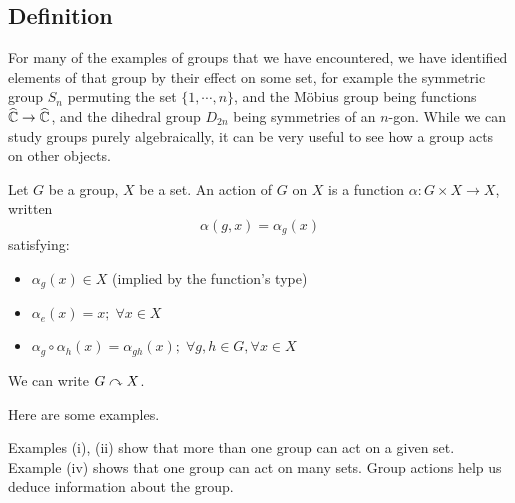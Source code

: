 \subsection{Definition}
For many of the examples of groups that we have encountered, we have identified elements of that group by their effect on some set, for example the symmetric group \(S_n\) permuting the set \(\{ 1, \cdots, n \}\), and the M\"obius group being functions \(\widehat{\mathbb C} \to \widehat{\mathbb C}\), and the dihedral group \(D_{2n}\) being symmetries of an \(n\)-gon.
While we can study groups purely algebraically, it can be very useful to see how a group acts on other objects.

\begin{definition}
	Let \(G\) be a group, \(X\) be a set.
	An action of \(G\) on \(X\) is a function \(\alpha: G \times X \to X\), written
	\[
		\alpha(g, x) = \alpha_g(x)
	\]
	satisfying:
	\begin{itemize}
		\item \(\alpha_g(x) \in X\) (implied by the function's type)
		\item \(\alpha_e(x) = x;\; \forall x \in X\)
		\item \(\alpha_g \circ \alpha_h(x) = \alpha_{gh}(x);\; \forall g, h \in G, \forall x \in X\)
	\end{itemize}
	We can write \(G \curvearrowright X\).
\end{definition}
Here are some examples.
Examples (i), (ii) show that more than one group can act on a given set.
Example (iv) shows that one group can act on many sets.
Group actions help us deduce information about the group.

